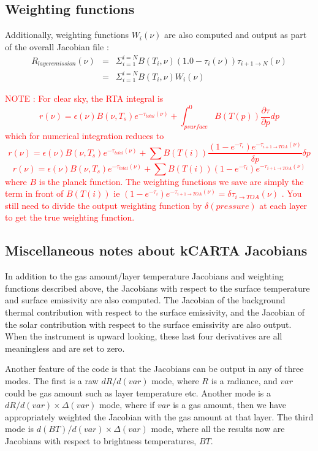 \documentclass[12pt]{article}
\begin{document}
{{{{\subsection{Weighting functions}
Additionally, weighting functions $W_{i}(\nu)$ are also computed and output 
as part of the overall Jacobian file :
\begin{eqnarray*}
R_{layer emission} (\nu) &  = &
\Sigma_{i=1}^{i=N} B(T_{i},\nu) (1.0 - \tau_{i}(\nu)) 
\tau_{i+1\rightarrow N}(\nu) \\
& = &\Sigma_{i=1}^{i=N} B(T_{i},\nu) W_{i}(\nu)
\end{eqnarray*}

\textcolor{red}{NOTE : For clear sky, the RTA integral is
\[
r(\nu) = \epsilon(\nu) B(\nu,T_s) e^{-\tau_{total}(\nu)} + \int_{psurface}^{0} B(T(p)) \frac{\partial \tau}{\partial p} dp
\]
which for numerical integration reduces to 
\[
r(\nu) = \epsilon(\nu) B(\nu,T_s) e^{-\tau_{total}(\nu)} + \sum B(T(i)) \frac{(1-e^{-\tau_i}) e^{-\tau_{i+1 \rightarrow TOA}(\nu)}}{\delta p} \delta p
\]
\[
r(\nu) = \epsilon(\nu) B(\nu,T_s) e^{-\tau_{total}(\nu)} + \sum B(T(i)) (1-e^{-\tau_i}) e^{-\tau_{i+1 \rightarrow TOA}(\nu)}
\]
where $B$ is the planck function. The weighting functions we save are
simply the term in front of $B(T(i))$ ie $ (1-e^{-\tau_i})
e^{-\tau_{i+1 \rightarrow TOA}(\nu)} = \delta \tau_{i \rightarrow
  TOA}(\nu)$ . You still need to divide the output weighting function by $\delta(pressure)$ at each
layer to get the true weighting function.}

\subsection{Miscellaneous notes about kCARTA Jacobians}
In addition to the gas amount/layer temperature Jacobians and
weighting functions described above, the Jacobians with respect to the
surface temperature and surface emissivity are also computed.  The
Jacobian of the background thermal contribution with respect to the
surface emissivity, and the Jacobian of the solar contribution with
respect to the surface emissivity are also output.  When the
instrument is upward looking, these last four derivatives are all
meaningless and are set to zero.

Another feature of the code is that the Jacobians can be output in any
of three modes.  The first is a raw $dR/d(var)$ mode, where $R$ is a
radiance, and $var$ could be gas amount such as layer temperature etc.
Another mode is a ${dR/d(var)} \times \Delta(var)$ mode, where if
$var$ is a gas amount, then we have appropriately weighted the
Jacobian with the gas amount at that layer.  The third mode is
${d(BT)/d(var)} \times \Delta(var)$ mode, where all the results now
are Jacobians with respect to brightness temperatures, $BT$.

}}}}
\end{document}
